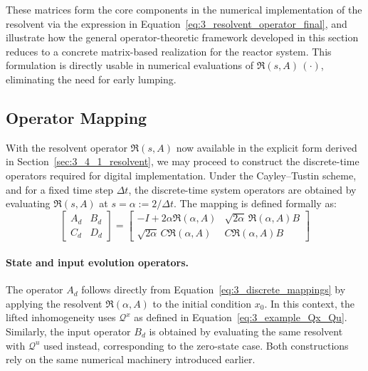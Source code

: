 These matrices form the core components in the numerical implementation of the resolvent via the expression in Equation~\eqref{eq:3_resolvent_operator_final}, and illustrate how the general operator-theoretic framework developed in this section reduces to a concrete matrix-based realization for the reactor system. This formulation is directly usable in numerical evaluations of $\mathfrak{R}(s, A)\, (\cdot)$, eliminating the need for early lumping.


\subsection{Operator Mapping} \label{sec:3_4_2_dt_operators}

With the resolvent operator $\mathfrak{R}(s, A)$ now available in the explicit form derived in Section~\ref{sec:3_4_1_resolvent}, we may proceed to construct the discrete-time operators required for digital implementation. Under the Cayley--Tustin scheme, and for a fixed time step $\Delta t$, the discrete-time system operators are obtained by evaluating $\mathfrak{R}(s, A)$ at $s = \alpha := 2 / \Delta t$. The mapping is defined formally as:
\begin{equation} \label{eq:3_discrete_mappings}
\begin{bmatrix}
A_d & B_d \\
C_d & D_d
\end{bmatrix}
=
\begin{bmatrix}
-I + 2\alpha \mathfrak{R}(\alpha, A) & \sqrt{2\alpha}\, \mathfrak{R}(\alpha, A) B \\
\sqrt{2\alpha}\, C \mathfrak{R}(\alpha, A) & C \mathfrak{R}(\alpha, A) B
\end{bmatrix}
\end{equation}

\paragraph{State and input evolution operators.}  
The operator $A_d$ follows directly from Equation~\eqref{eq:3_discrete_mappings} by applying the resolvent $\mathfrak{R}(\alpha, A)$ to the initial condition $x_0$. In this context, the lifted inhomogeneity uses $\mathcal{Q}^x$ as defined in Equation~\eqref{eq:3_example_Qx_Qu}. Similarly, the input operator $B_d$ is obtained by evaluating the same resolvent with $\mathcal{Q}^u$ used instead, corresponding to the zero-state case. Both constructions rely on the same numerical machinery introduced earlier.

